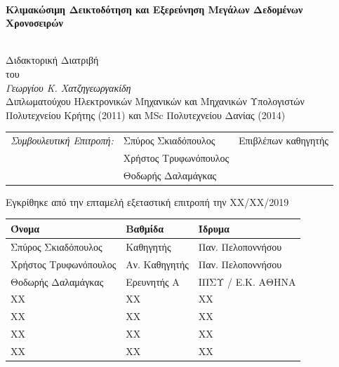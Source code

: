 \begin{center}
%
%
%


\vspace{-3ex}
\HRule \\[0.4cm]
{ \huge \bfseries Κλιμακώσιμη Δεικτοδότηση και Εξερεύνηση Μεγάλων Δεδομένων Χρονοσειρών \\[0.4cm] }
\HRule \\[1.5cm]
\vspace{-5ex}
\small
\begin{center}
Διδακτορική Διατριβή\\
του\\
{\large \emph{Γεωργίου Κ. Χατζηγεωργακίδη}}\\
\vspace{1.4ex}
Διπλωματούχου Ηλεκτρονικών Μηχανικών και Μηχανικών Υπολογιστών Πολυτεχνείου Κρήτης (2011) και MSc Πολυτεχνείου Δανίας (2014) \\

\end{center}
\vfill
\begin{center}
\begin{tabular}{lll}
\emph{Συμβουλευτική Επιτροπή:} & Σπύρος Σκιαδόπουλος & Επιβλέπων καθηγητής\\
& Χρήστος Τρυφωνόπουλος\\
& Θοδωρής Δαλαμάγκας\\
\end{tabular}
\end{center}

\vspace{2ex}
Εγκρίθηκε από την επταμελή εξεταστική επιτροπή την ΧΧ/ΧΧ/2019\\
\vfill


\begin{tabular}{l@{\hskip 1in}l@{\hskip 1in}l}
Όνομα & Βαθμίδα & Ίδρυμα \\ \hline \hline
Σπύρος Σκιαδόπουλος & Καθηγητής & Παν. Πελοποννήσου\\
Χρήστος Τρυφωνόπουλος & Αν. Καθηγητής & Παν. Πελοποννήσου\\
Θοδωρής Δαλαμάγκας & Ερευνητής Α & ΙΠΣΥ / Ε.Κ. ΑΘΗΝΑ\\
ΧΧ & ΧΧ & ΧΧ\\
ΧΧ & ΧΧ & ΧΧ\\
ΧΧ & ΧΧ & ΧΧ\\
ΧΧ & ΧΧ & ΧΧ\\
\end{tabular}



\end{center}

